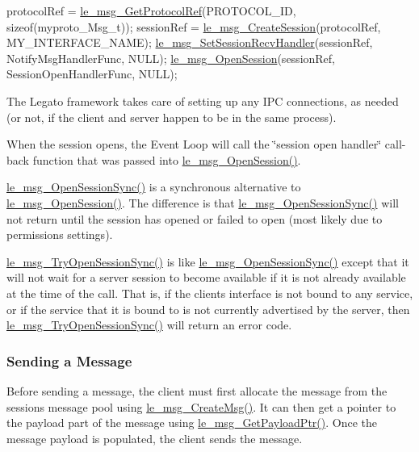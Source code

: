 \begin{DoxyCode}
protocolRef = \hyperlink{le__messaging_8h_adcd1ff1a6906433aaa6d7038125c4473}{le\_msg\_GetProtocolRef}(PROTOCOL\_ID, \textcolor{keyword}{sizeof}(myproto\_Msg\_t));
sessionRef = \hyperlink{le__messaging_8h_a696d7c2d4e3725d3ddb5dd2d79d2d732}{le\_msg\_CreateSession}(protocolRef, MY\_INTERFACE\_NAME);
\hyperlink{le__messaging_8h_ac726cc93219d326e1b10a7d13a0f4f65}{le\_msg\_SetSessionRecvHandler}(sessionRef, NotifyMsgHandlerFunc, NULL);
\hyperlink{le__messaging_8h_a574d37960a07c4fc2bde310408619cff}{le\_msg\_OpenSession}(sessionRef, SessionOpenHandlerFunc, NULL);
\end{DoxyCode}


The Legato framework takes care of setting up any I\+P\+C connections, as needed (or not, if the client and server happen to be in the same process).

When the session opens, the Event Loop will call the \char`\"{}session open handler\char`\"{} call-\/back function that was passed into \hyperlink{le__messaging_8h_a574d37960a07c4fc2bde310408619cff}{le\+\_\+msg\+\_\+\+Open\+Session()}.

\hyperlink{le__messaging_8h_a8c6480e3708e20e1f9da032a93c80bc0}{le\+\_\+msg\+\_\+\+Open\+Session\+Sync()} is a synchronous alternative to \hyperlink{le__messaging_8h_a574d37960a07c4fc2bde310408619cff}{le\+\_\+msg\+\_\+\+Open\+Session()}. The difference is that \hyperlink{le__messaging_8h_a8c6480e3708e20e1f9da032a93c80bc0}{le\+\_\+msg\+\_\+\+Open\+Session\+Sync()} will not return until the session has opened or failed to open (most likely due to permissions settings).

\hyperlink{le__messaging_8h_a2ee1410da1dc345c86d6958b6cdda5e1}{le\+\_\+msg\+\_\+\+Try\+Open\+Session\+Sync()} is like \hyperlink{le__messaging_8h_a8c6480e3708e20e1f9da032a93c80bc0}{le\+\_\+msg\+\_\+\+Open\+Session\+Sync()} except that it will not wait for a server session to become available if it is not already available at the time of the call. That is, if the client\textquotesingle{}s interface is not bound to any service, or if the service that it is bound to is not currently advertised by the server, then \hyperlink{le__messaging_8h_a2ee1410da1dc345c86d6958b6cdda5e1}{le\+\_\+msg\+\_\+\+Try\+Open\+Session\+Sync()} will return an error code.\hypertarget{c_messaging_c_messagingClientSending}{}\subsubsection{Sending a Message}\label{c_messaging_c_messagingClientSending}
Before sending a message, the client must first allocate the message from the session\textquotesingle{}s message pool using \hyperlink{le__messaging_8h_a8293a69f256b98cbce5b9990ea3520f3}{le\+\_\+msg\+\_\+\+Create\+Msg()}. It can then get a pointer to the payload part of the message using \hyperlink{le__messaging_8h_a32d1c7ffd913db8546f6f1bd5cce58c4}{le\+\_\+msg\+\_\+\+Get\+Payload\+Ptr()}. Once the message payload is populated, the client sends the message.


